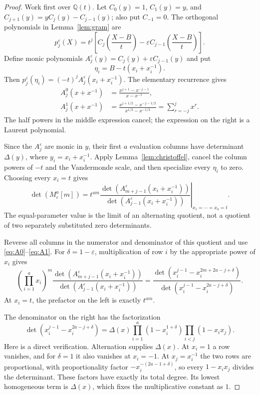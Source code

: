 \documentclass[11pt]{article}
\theoremstyle{definition}
\theoremstyle{remark}
\newcommand{\Q}{\mathbb Q}
\newcommand{\Dlt}{\Delta}
\newcommand{\eps}{\varepsilon}
\numberwithin{equation}{section}
\begin{document}
\begin{proof}
Work first over $\Q(t)$. Let $C_0(y)=1$, $C_1(y)=y$, and
$C_{j+1}(y)=yC_j(y)-C_{j-1}(y)$; also put $C_{-1}=0$.
The orthogonal polynomials in Lemma~\ref{lem:gram} are
\[
 p_j^\eps(X)=t^j\left[C_j\left(\frac{X-B}{t}\right)
 -\eps C_{j-1}\left(\frac{X-B}{t}\right)\right].
\]
Define monic polynomials $A_j^\eps(y)=C_j(y)+\eps C_{j-1}(y)$ and put
\[
 \eta_i=B-t(x_i+x_i^{-1}).
\]
Then $p_j^\eps(\eta_i)=(-t)^jA_j^\eps(x_i+x_i^{-1})$.
The elementary recurrence gives
\begin{align}
 A_j^0(x+x^{-1})&=\frac{x^{j+1}-x^{-j-1}}{x-x^{-1}},\label{eq:A0}\\
 A_j^1(x+x^{-1})&=\frac{x^{j+1/2}-x^{-j-1/2}}
 {x^{1/2}-x^{-1/2}}=\sum_{r=-j}^{j}x^r.\label{eq:A1}
\end{align}
The half powers in the middle expression cancel; the expression on the
right is a Laurent polynomial.

Since the $A_j^\eps$ are monic in $y$, their first $a$ evaluation columns
have determinant $\Dlt(y)$, where $y_i=x_i+x_i^{-1}$.
Apply Lemma~\ref{lem:christoffel}, cancel the column powers of $-t$ and
the Vandermonde scale, and then specialize every $\eta_i$ to zero.
Choosing every $x_i=t$ gives
\begin{equation}
 \det(M_\eps^a[m])=
 t^{am}\left.
 \frac{\det(A_{m+j-1}^\eps(x_i+x_i^{-1}))}
 {\det(A_{j-1}^\eps(x_i+x_i^{-1}))}
 \right|_{x_1=\cdots=x_a=t}.
 \label{eq:character-step}
\end{equation}
The equal-parameter value is the limit of an alternating quotient, not a
quotient of two separately substituted zero determinants.

Reverse all columns in the numerator and denominator of this quotient and
use \eqref{eq:A0}--\eqref{eq:A1}. For $\delta=1-\eps$, multiplication
of row $i$ by the appropriate power of $x_i$ gives
\begin{equation}
 \left(\prod_{i=1}^a x_i\right)^m
 \frac{\det(A_{m+j-1}^\eps(x_i+x_i^{-1}))}
 {\det(A_{j-1}^\eps(x_i+x_i^{-1}))}
 =
 \frac{\det(x_i^{j-1}-x_i^{2m+2a-j+\delta})}
 {\det(x_i^{j-1}-x_i^{2a-j+\delta})}.
 \label{eq:alternant-ratio}
\end{equation}
At $x_i=t$, the prefactor on the left is exactly $t^{am}$.

The denominator on the right has the factorization
\begin{equation}
 \det(x_i^{j-1}-x_i^{2a-j+\delta})
 =\Dlt(x)\prod_{i=1}^a(1-x_i^{1+\delta})
 \prod_{i<j}(1-x_ix_j).
 \label{eq:den-factor}
\end{equation}
Here is a direct verification. Alternation supplies $\Dlt(x)$.
At $x_i=1$ a row vanishes, and for $\delta=1$ it also vanishes at $x_i=-1$.
At $x_j=x_i^{-1}$ the two rows are proportional, with proportionality
factor $-x_i^{-(2a-1+\delta)}$, so every $1-x_ix_j$ divides the determinant.
These factors have exactly its total degree. Its lowest homogeneous term
is $\Dlt(x)$, which fixes the multiplicative constant as $1$.


\end{proof}
\end{document}
